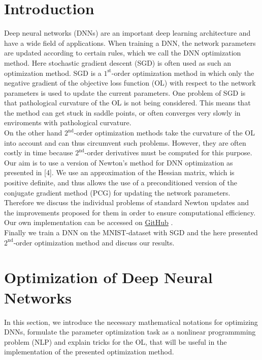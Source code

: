 \documentclass[conference]{IEEEtran}
\begin{document}
	\section{Introduction}
	\noindent
	Deep neural networks (DNNs) are an important deep learning architecture and have a wide field of applications. When training a DNN, the network parameters are updated according to certain rules, which we call the DNN optimization method. Here stochastic gradient descent (SGD) is often used as such an optimization method. SGD is a $1^{\text{st}}$-order optimization method in which only the negative gradient of the objective loss function (OL) with respect to the network parameters is used to update the current parameters. One problem of SGD is that pathological curvature of the OL is not being considered. This means that the method can get stuck in saddle points, or often converges very slowly in enviroments with pathological curvature.\\
	On the other hand $2^{\text{nd}}$-order optimization methods take the curvature of the OL into account and can thus circumvent such problems. However, they are often costly in time because $2^{\text{nd}}$-order derivatives must be computed for this purpose.\\
	Our aim is to use a version of Newton's method for DNN optimization as presented in [4]. We use an approximation of the Hessian matrix, which is positive definite, and thus allows the use of a preconditioned version of the conjugate gradient method (PCG) for updating the network parameters. Therefore we discuss the individual problems of standard Newton updates and the improvements proposed for them in order to ensure computational efficiency. Our own implementation can be accessed on \href{https://github.com/NiklasBrunn/Hessian_Free_Optimization_of_Deep_Neural_Networks}{GitHub} .\\
	Finally we train a DNN on the MNIST-dataset with SGD and the here presented $2^{\text{nd}}$-order optimization method and discuss our results.


	\section{Optimization of Deep Neural Networks}
	\noindent
	In this section, we introduce the necessary mathematical notations for optimizing DNNs, formulate the parameter optimization task as a nonlinear programmming problem (NLP) and explain tricks for the OL, that will be useful in the implementation of the presented optimization method.
\end{document}
